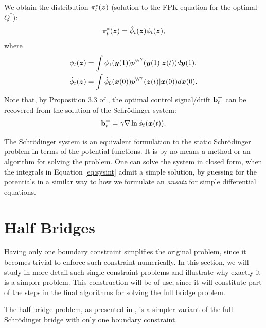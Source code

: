 \documentclass[a4paper,12pt,twoside,openright]{report}
\theoremstyle{definition}
\begin{document}
We obtain the distribution $\pi^{*}_t({\bm{z}})$ (solution to the FPK equation for the optimal $Q^{*}$):
\begin{align}
    \pi^{*}_t({\bm{z}}) =  {\hat{\phi}}_t({\bm{z}}) \phi_t({\bm{z}}) ,
\end{align}
where
\begin{align}
    \phi_t({\bm{z}}) &= \int \phi_1({\bm{y}}(1) ) p^{\mathbb{W}^{\gamma}}({\bm{y}}(1)|{\bm{z}}(t)) d{\bm{y}}(1), \nonumber\\ 
    {\hat{\phi}}_t({\bm{z}}) &= \int {\hat{\phi}}_0({\bm{x}}(0)) p^{\mathbb{W}^{\gamma}}({\bm{z}}(t)|{\bm{x}}(0)) d{\bm{x}}(0). \nonumber
\end{align}
Note that, by Proposition 3.3 of \cite{pavon1991free}, the optimal control signal/drift ${\mathbf{b}}_t^+$ can be recovered from the solution of the Schrödinger system:
\begin{align} \label{eq:drifr_potential}
    {\mathbf{b}}_t^{+} = \gamma \nabla \ln \phi_t({\bm{x}}(t) ).
\end{align}

The Schrödinger system is an equivalent formulation to the static Schrödinger problem in terms of the potential functions. It is by no means a method or an algorithm for solving the problem. One can solve the system in closed form, when the integrals in Equation \ref{eq:sysint} admit a simple solution, by guessing for the potentials in a similar way to how we formulate an \textit{ansatz} for simple differential equations. 

\section{Half Bridges}

Having only one boundary constraint simplifies the original problem, since it becomes trivial to enforce such constraint numerically. In this section, we will study in more detail such single-constraint problems and illustrate why exactly it is a simpler problem. This construction will be of use, since it will constitute part of the steps in the final algorithms for solving the full bridge problem.

The half-bridge problem, as presented in \cite{pavon2018data}, is a simpler variant of the full Schrödinger bridge with only one boundary constraint. 
\end{document}
